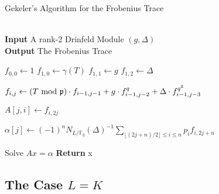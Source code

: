 \documentclass{jams-l}
\theoremstyle{remark}
\numberwithin{equation}{section}
\begin{document}
 \begin{algorithm}
\caption{Gekeler's Algorithm for the Frobenius Trace}\label{euclid}
\begin{algorithmic}[1]
\\

\hspace*{\algorithmicindent} \textbf{Input} A rank-2 Drinfeld Module $(g, \Delta)$\\
 \hspace*{\algorithmicindent} \textbf{Output} The Frobenius Trace
 
\State $f_{0,0} \gets 1$
\State $f_{1,0} \gets \gamma(T)$
\State $f_{1,1} \gets g$
\State $f_{1,2} \gets \Delta$

\State $f_{i,j} \gets (T \textnormal{ mod } \mathfrak{p}) \cdot f_{i-1,j-1} + g\cdot f_{i-1,j-2}^q + \Delta \cdot f_{i-1,j-3}^{q^2}$
\EndFor
\EndFor

\State $A[j,i] \gets f_{i,2j} $
\EndFor
\EndFor

\State $ \alpha[j] \gets (-1)^nN_{L/\mathbb{F}_q}(\Delta)^{-1} \sum_{\lfloor (2j+n)/2 \rfloor \leq i \leq n} p_i f_{i,2j + n}$
\EndFor

\State Solve $Ax = \alpha$ 
\State \textbf{Return} x
\EndProcedure
\end{algorithmic}
\end{algorithm}






\subsection{The Case $L = K$}
\end{document}

